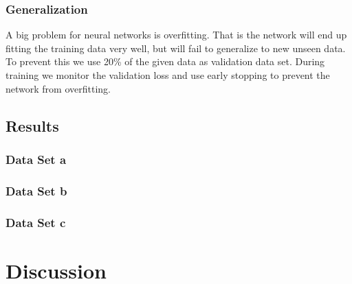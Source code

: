 \documentclass[acmsmall,nonacm]{acmart}
\begin{document}
\subsubsection{Generalization}
A big problem for neural networks is overfitting. That is the network will end up fitting the training data very well, but will fail to generalize to new unseen data. To prevent this we use 20\% of the given data as validation data set. During training we monitor the validation loss and use early stopping to prevent the network from overfitting. 


\subsection{Results}

\subsubsection{Data Set a}

\subsubsection{Data Set b}

\subsubsection{Data Set c}


\section{Discussion}

%


\pagebreak  




\end{document}
